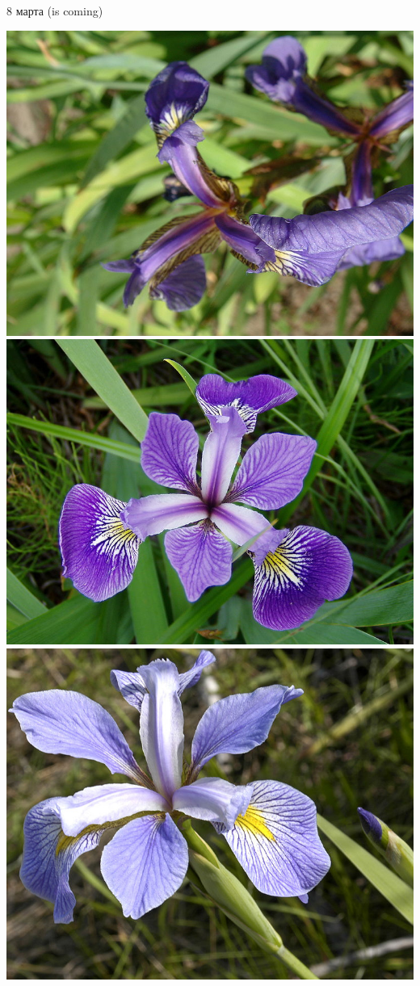 \documentclass[10pt,a4paper]{beamer}
\begin{document}

\begin{frame}{8 марта (is coming)}

\begin{center}
\includegraphics[scale=0.1]{images/setosa.jpg} \;
\includegraphics[scale=0.1]{images/versicolor.jpg} \;
\includegraphics[scale=0.416]{images/virginica.jpg}

\end{center}
\end{frame}
\end{document}

